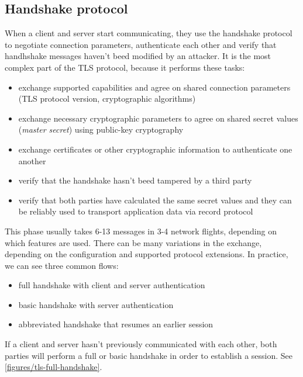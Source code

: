 \subsection{Handshake protocol}
\label{toc/tls-handshake}

When a client and server start communicating, they use the handshake protocol to negotiate connection parameters, authenticate each other and verify that handhshake messages haven't beed modified by an attacker. It is the most complex part of the TLS protocol, because it performs these tasks:

\begin{itemize}
  \item exchange supported capabilities and agree on shared connection parameters (TLS protocol version, cryptographic algorithms)
  \item exchange necessary cryptographic parameters to agree on shared secret values (\textit{master secret}) using public-key cryptography
  \item exchange certificates or other cryptographic information to authenticate one another
  \item verify that the handshake hasn't beed tampered by a third party
  \item verify that both parties have calculated the same secret values and they can be reliably used to transport application data via record protocol
\end{itemize}

This phase usually takes 6-13 messages in 3-4 network flights, depending on which features are used. There can be many variations in the exchange, depending on the configuration and supported protocol extensions. In practice, we can see three common flows:

\begin{itemize}
  \item full handshake with client and server authentication
  \item basic handshake with server authentication
  \item abbreviated handshake that resumes an earlier session
\end{itemize}




If a client and server hasn't previously communicated with each other, both parties will perform a full or basic handshake in order to establish a session. See \autoref{figures/tls-full-handshake}.

